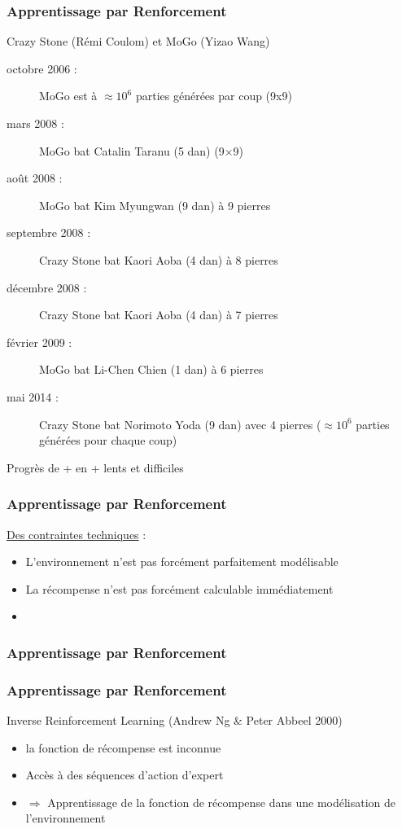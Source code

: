 \documentclass{formation}
\begin{document}
\begin{frame}
  \frametitle{Apprentissage par Renforcement}
  Crazy Stone (Rémi Coulom) et MoGo (Yizao Wang)
  \newline
  \begin{description}
  \item[octobre 2006 :] MoGo est à $\approx 10^6$ parties générées par coup (9x9)
  \item[mars 2008 :] MoGo bat Catalin Taranu (5 dan) (9×9)
  \item[août 2008 :] MoGo bat Kim Myungwan (9 dan) à 9 pierres
  \item[septembre 2008 :] Crazy Stone bat Kaori Aoba (4 dan) à 8 pierres
  \item[décembre 2008 :] Crazy Stone bat Kaori Aoba (4 dan) à 7 pierres
  \item[février 2009 :] MoGo bat Li-Chen Chien (1 dan) à 6 pierres
  \item[mai 2014 :] Crazy Stone bat Norimoto Yoda (9 dan) avec 4 pierres ($\approx 10^{6}$ parties générées pour chaque coup)
  \end{description}
  \begin{center}
    Progrès de + en + lents et difficiles
  \end{center}
\end{frame}

\begin{frame}
  \frametitle{Apprentissage par Renforcement}
  \underline{Des contraintes techniques} :
  \begin{itemize}
  \item L'environnement n'est pas forcément parfaitement modélisable
  \item La récompense n'est pas forcément calculable immédiatement
  \item {}
  \end{itemize}
\end{frame}

\begin{frame}
  \frametitle{Apprentissage par Renforcement}
\end{frame}

\begin{frame}
  \frametitle{Apprentissage par Renforcement}
  Inverse Reinforcement Learning (Andrew Ng \& Peter Abbeel 2000)
  \begin{itemize}
  \item la fonction de récompense est inconnue
  \item Accès à des séquences d'action d'expert
  \item $\Rightarrow$ Apprentissage de la fonction de récompense dans une modélisation de l'environnement
  \end{itemize}
  \href{https://www.youtube.com/watch?v=VCdxqn0fcnE}{}
\end{frame}
\end{document}
